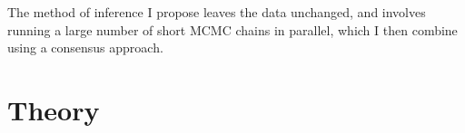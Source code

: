 \documentclass[12pt]{article} %
\begin{document}
	The method of inference I propose leaves the data unchanged, and involves running a large number of short MCMC chains in parallel, which I then combine using a consensus approach. 
	
		
	

	
	
	
	

	
	
	
%	

	\section{Theory}	
\end{document}
